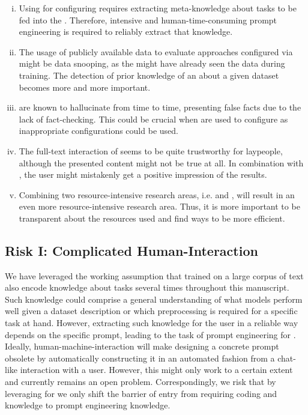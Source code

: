 \documentclass[10pt]{article} %
\begin{document}
\begin{enumerate}[(i)]
    \item Using \LLMs for configuring \AutoML requires extracting meta-knowledge about \AutoML tasks to be fed into the \LLMs. Therefore, intensive and human-time-consuming prompt engineering is required to reliably extract that knowledge.
    \item The usage of publicly available data to evaluate \AutoML approaches configured via \LLMs might be data snooping, as the \LLM might have already seen the data during training. The detection of prior knowledge of an \LLM about a given dataset becomes more and more important.
    \item \LLMs are known to hallucinate from time to time, presenting false facts due to the lack of fact-checking. This could be crucial when \LLMs are used to configure \AutoML as inappropriate configurations could be used.
    \item The full-text interaction of \LLMs seems to be quite trustworthy for laypeople, although the presented content might not be true at all. In combination with \AutoML, the user might mistakenly get a positive impression of the results.
    \item Combining two resource-intensive research areas, i.e. \LLMs and \AutoML, will result in an even more resource-intensive research area. Thus, it is more important to be transparent about the resources used and find ways to be more efficient.
\end{enumerate}

\subsection{Risk I: Complicated Human-Interaction} We have leveraged the working assumption that \LLMs trained on a large corpus of text also encode knowledge about \AutoML tasks several times throughout this manuscript. Such knowledge could comprise a general understanding of what models perform well given a dataset description or which preprocessing is required for a specific task at hand. However, extracting such knowledge for the user in a reliable way depends on the specific prompt, leading to the task of prompt engineering for \AutoML \citep{sorensen-etal-2022-information}. Ideally, human-machine-interaction will make designing a concrete prompt obsolete by automatically constructing it in an automated fashion from a chat-like interaction with a user. However, this might only work to a certain extent and currently remains an open problem. Correspondingly, we risk that by leveraging \LLMs for \AutoML we only shift the barrier of entry from requiring coding and \ML knowledge to prompt engineering knowledge. 
\end{document}
